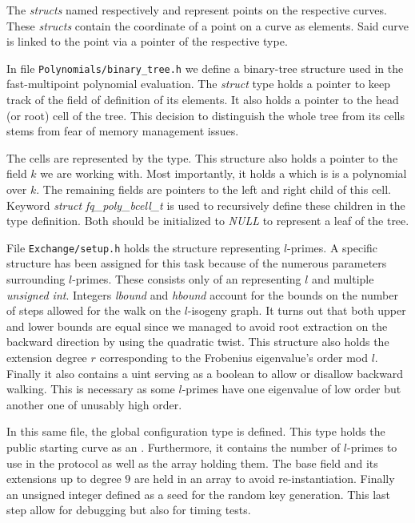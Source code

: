 \documentclass[../main.tex]{subfilesubs}
\begin{document}
The \textit{structs} named respectively  and  represent points on the respective curves.
These \textit{structs} contain the coordinate of a point on a curve as  elements.
Said curve is linked to the point via a pointer of the respective type.

In file \texttt{Polynomials/binary\_tree.h} we define a binary-tree structure used in the fast-multipoint polynomial evaluation.
The \textit{struct} type  holds a   pointer to keep track of the field of definition of its elements.
It also holds a pointer to the head (or root) cell of the tree.
This decision to distinguish the whole tree from its cells stems from fear of memory management issues.

The cells are represented by the  type.
This structure also holds a pointer to the field $k$ we are working with.
Most importantly, it holds a  which is is a polynomial over $k$.
The remaining fields are  pointers to the left and right child of this cell.
Keyword \textit{struct fq\_poly\_bcell\_t} is used to recursively define these children in the type definition.
Both should be initialized to \textit{NULL} to represent a leaf of the tree.

File \texttt{Exchange/setup.h} holds the  structure representing $l$-primes.
A specific structure has been assigned for this task because of the numerous parameters surrounding $l$-primes.
These consists only of an  representing $l$ and multiple \textit{unsigned int}.
Integers \textit{lbound} and \textit{hbound} account for the bounds on the number of steps allowed for the walk on the $l$-isogeny graph.
It turns out that both upper and lower bounds are equal since we managed to avoid root extraction on the backward direction by using the quadratic twist.
This structure also holds the extension degree $r$ corresponding to the Frobenius eigenvalue's order mod $l$.
Finally it also contains a uint serving as a boolean to allow or disallow backward walking.
This is necessary as some $l$-primes have one eigenvalue of low order but another one of unusably high order.

In this same file, the global configuration type  is defined.
This type holds the public starting curve as an .
Furthermore, it contains the number of $l$-primes to use in the protocol as well as the  array holding them.
The base field and its extensions up to degree $9$  are held in an  array to avoid re-instantiation.
Finally an unsigned integer defined as a seed for the random key generation.
This last step allow for debugging but also for timing tests.
\end{document}
